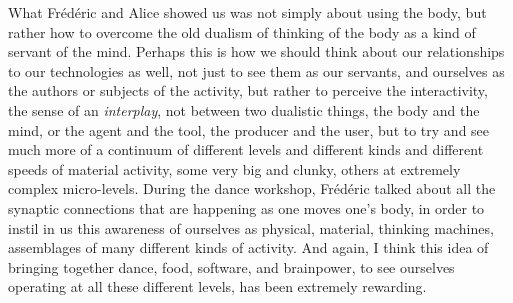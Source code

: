 {What Fr\'ed\'eric and Alice showed us was not simply about using the
body, but rather how to overcome the old dualism of thinking of the
body as a kind of servant of the mind. Perhaps this is how we should
think about our relationships to our technologies as well, not just to
see them as our servants, and ourselves as the authors or subjects of
the activity, but rather to perceive the interactivity, the sense of an
{\em interplay}, not between two dualistic things, the body and the
mind, or the agent and the tool, the producer and the user, but to try
and see much more of a continuum of different levels and different
kinds and different speeds of material activity, some very big and
clunky, others at extremely complex micro{}-levels. During the dance
workshop, Fr\'ed\'eric talked about all the synaptic connections that
are happening as one moves one's body, in order to instil in us this
awareness of ourselves as physical, material, thinking machines,
assemblages of many different kinds of activity. And again, I think
this idea of bringing together dance, food, software, and brainpower,
to see ourselves operating at all these different levels, has been
extremely rewarding. 

}

